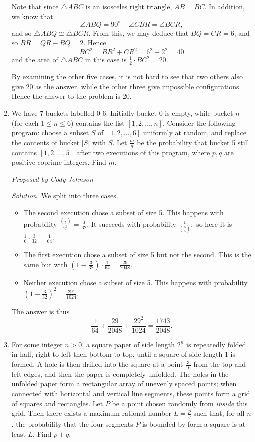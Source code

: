 \documentclass[10pt]{article}
\newcommand{\proposed}[1]
{
\vspace{5pt}
\noindent\textit{Proposed by #1}
}
\newcommand{\solution}
{
\vspace{5pt}
\noindent\textit{Solution.}\qquad
}
\begin{document}
\begin{enumerate}
Note that since $\triangle ABC$ is an isosceles right triangle, $AB=BC$.  In
addition, we know that \[\angle ABQ = 90^\circ-\angle CBR = \angle BCR,\] and so
$\triangle ABQ\cong\triangle BCR$.  From this, we may deduce that $BQ=CR=6$, and so $BR = QR-BQ = 2$.  Hence \[BC^2=BR^2+CR^2=6^2+2^2=40\] and the area of $\triangle ABC$ in this case is $\tfrac12\cdot BC^2=20$.

\par By examining the other five cases, it is not hard to see that two others also give $20$ as the answer, while the other three give impossible configurations.  Hence the answer to the problem is $\boxed{20}$.

\item We have 7 buckets labelled 0-6. Initially bucket 0 is empty, while bucket
	$n$ (for each $1 \leq n \leq 6$) contains the list $[1,2, \ldots, n]$.
	Consider the following program: choose a subset $S$ of $[1,2,\ldots, 6]$
	uniformly at random, and replace the contents of bucket $|S|$ with $S$.
	Let $\frac{m}{n}$ be the probability that bucket 5 still contains $[1,2,
	\ldots, 5]$ after two executions of this program, where $p,q$ are positive coprime integers. Find $m$. %

\proposed{Cody Johnson}

\solution We split into three cases.
\begin{itemize}
	\item The second execution chose a subset of size 5. This happens with
		probability $\frac{\binom{6}{5}}{2^{6}} = \frac{3}{32}.$
		It succeeds with probability
		$\frac{1}{\binom{6}{5}},$ so here it is
		$\frac{1}{6} \cdot \frac{3}{32} = \frac{1}{64}$.
	\item The first execution chose a subset of size 5 but not the second.
		This is the same but with $\left(1 -
		\frac{3}{32}\right) \cdot\frac{1}{64} = \frac{29}{2048}$.
	\item Neither execution chose a subset of size 5. This happens with
		probability $\left(1-
		\frac{3}{32}\right)^{2} = \frac{29^{2}}{1024}$.
\end{itemize}
The answer is thus 
\[
	\frac{1}{64} + \frac{29}{2048} + \frac{29^{2}}{1024} =
	\frac{\boxed{1743}}{2048}.
\]

\item For some integer $n > 0$, a square paper of side length $2^{n}$ is repeatedly folded in half, right-to-left then bottom-to-top, until a square of side length 1 is formed. A hole is then drilled into the square at a point $\tfrac{3}{16}$ from the top and left edges, and then the paper is completely unfolded. The holes in the unfolded paper form a rectangular array of unevenly spaced points; when connected with horizontal and vertical line segments, these points form a grid of squares and rectangles. Let $P$ be a point chosen randomly from \textit{inside} this grid. Then there exists a maximum rational number $L = \tfrac{p}{q}$ such that, for all $n$, the probability that the four segments $P$ is bounded by form a square is at least $L$. Find $p+q$.


\end{enumerate}
\end{document}
